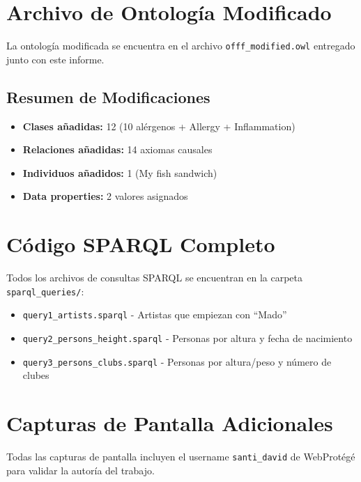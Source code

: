 \documentclass[12pt,a4paper]{article}
\begin{document}
\newpage
\appendix

\section{Archivo de Ontología Modificado}

La ontología modificada se encuentra en el archivo \texttt{offf\_modified.owl} entregado junto con este informe.

\subsection{Resumen de Modificaciones}

\begin{itemize}
    \item \textbf{Clases añadidas:} 12 (10 alérgenos + Allergy + Inflammation)
    \item \textbf{Relaciones añadidas:} 14 axiomas causales
    \item \textbf{Individuos añadidos:} 1 (My fish sandwich)
    \item \textbf{Data properties:} 2 valores asignados
\end{itemize}

\section{Código SPARQL Completo}

Todos los archivos de consultas SPARQL se encuentran en la carpeta \texttt{sparql\_queries/}:

\begin{itemize}
    \item \texttt{query1\_artists.sparql} - Artistas que empiezan con ``Mado''
    \item \texttt{query2\_persons\_height.sparql} - Personas por altura y fecha de nacimiento
    \item \texttt{query3\_persons\_clubs.sparql} - Personas por altura/peso y número de clubes
\end{itemize}

\section{Capturas de Pantalla Adicionales}

Todas las capturas de pantalla incluyen el username \texttt{santi\_david} de WebProtégé para validar la autoría del trabajo.
\end{document}
